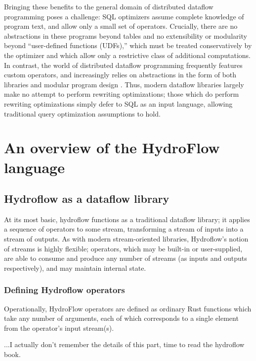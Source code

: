 Bringing these benefits to the general domain of distributed dataflow programming poses a challenge: SQL optimizers assume complete knowledge of program text, and allow only a small set of operators.  Crucially, there are no abstractions in these programs beyond tables and no extensibility or modularity beyond ``user-defined functions (UDFs),'' which must be treated conservatively by the optimizer and which allow only a restrictive class of additional computations.  In contrast, the world of distributed dataflow programming frequently features custom operators, and increasingly relies on abstractions in the form of both libraries and modular program design \cite{hope-this-is-true!}. Thus, modern dataflow libraries largely make no attempt to perform rewriting optimizations; those which do perform rewriting optimizations simply defer to SQL as an input language, allowing traditional query optimization assumptions to hold. 

\section{An overview of the HydroFlow language}
\label{sec:hydroflow-overview}

\subsection{Hydroflow as a dataflow library}

At its most basic, hydroflow functions as a traditional dataflow
library; it applies a sequence of operators to some stream,
transforming a stream of inputs into a stream of outputs. As with
modern stream-oriented libraries, Hydroflow's notion of streams is
highly flexible; operators, which may be built-in or user-supplied,
are able to consume and produce any number of streams (as inputs and
outputs respectively), and may maintain internal state.

\subsubsection{Defining Hydroflow operators}

Operationally, HydroFlow operators are defined as ordinary Rust
functions which take any number of arguments, each of which
corresponds to a single element from the operator's input stream(s).

...I actually don't remember the details of this part, time to read the hydroflow book.


